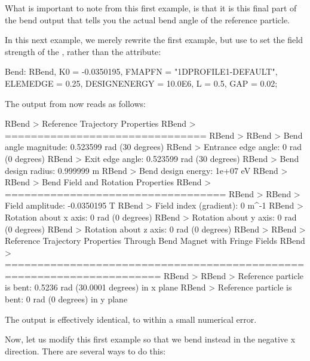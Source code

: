 What is important to note from this first example, is that it is this final part of the bend output that
tells you the actual bend angle of the reference particle.

In this next example, we merely rewrite the first example, but use  to set the field strength
of the , rather than the  attribute:

\begin{example}
Bend: RBend, K0 = -0.0350195,
	     FMAPFN = "1DPROFILE1-DEFAULT",
	     ELEMEDGE = 0.25,
	     DESIGNENERGY = 10.0E6,
	     L = 0.5,
	     GAP = 0.02;
\end{example}
The output from \opal now reads as follows:

\begin{example}
RBend > Reference Trajectory Properties
RBend > ===============================
RBend >
RBend > Bend angle magnitude:    0.523599 rad (30 degrees)
RBend > Entrance edge angle:     0 rad (0 degrees)
RBend > Exit edge angle:         0.523599 rad (30 degrees)
RBend > Bend design radius:      0.999999 m
RBend > Bend design energy:      1e+07 eV
RBend >
RBend > Bend Field and Rotation Properties
RBend > ==================================
RBend >
RBend > Field amplitude:         -0.0350195 T
RBend > Field index (gradient):  0 m^-1
RBend > Rotation about x axis:   0 rad (0 degrees)
RBend > Rotation about y axis:   0 rad (0 degrees)
RBend > Rotation about z axis:   0 rad (0 degrees)
RBend >
RBend > Reference Trajectory Properties Through Bend Magnet with Fringe Fields
RBend > ======================================================================
RBend >
RBend > Reference particle is bent: 0.5236 rad (30.0001 degrees) in x plane
RBend > Reference particle is bent: 0 rad (0 degrees) in y plane
\end{example}
The output is effectively identical, to within a small numerical error.

Now, let us modify this first example so that we bend instead in the negative x direction. There are several
ways to do this:


